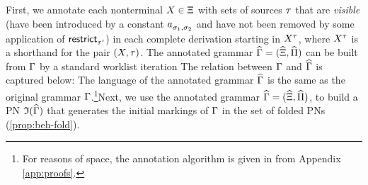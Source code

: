 First, we annotate each nonterminal $X \in \Xi$ with sets of
sources $\tau$ that are \emph{visible} (\ie have been introduced by
a constant ${a}^{}_{{\sigma_1},{\sigma_2}}$ and have not been removed
by some application of $\mathsf{restrict}^{}_{{\tau'}}$) in each complete
derivation starting in ${X}^{\tau}$, where ${X}^{\tau}$
is a shorthand for the pair $(X,\tau)$.  The annotated grammar
$\widehat{\Gamma} = (\widehat{\Xi}, \widehat{\Pi})$ can be
built from $\Gamma$ by a standard worklist iteration \ifLongVersion
The relation between $\Gamma$ and $\widehat{\Gamma}$ is captured
below: \else The language of the annotated grammar
$\widehat{\Gamma}$ is the same as the original grammar
$\Gamma$.\else\footnote{For reasons of space, the annotation
  algorithm is given in  from Appendix
  \ref{app:proofs}.}\fi Next, we use the annotated grammar
$\widehat{\Gamma} = (\widehat{\Xi},\widehat{\Pi})$, to build
a PN $\mathfrak{I}({\widehat{\Gamma}})$ that generates the initial markings
of $\Gamma$ in the set of folded PNs (\autoref{prop:beh-fold}).

